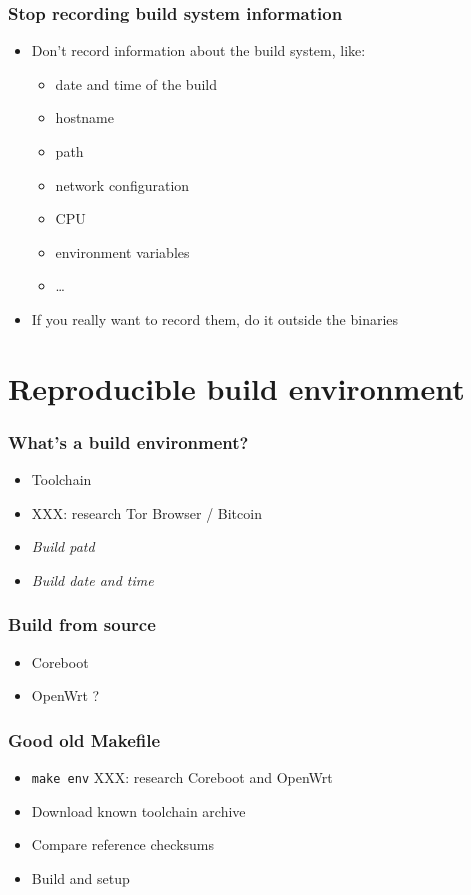 \documentclass[14pt,ignorenonframetext]{beamer}
\begin{document}
\begin{frame}
 \frametitle{Stop recording build system information}

 \begin{itemize}
  \item Don't record information about the build system, like:
   \begin{itemize}
    \item date and time of the build
    \item hostname
    \item path
    \item network configuration
    \item CPU
    \item environment variables
    \item …
   \end{itemize}
  \item<2> If you really want to record them, do it outside the binaries
 \end{itemize}
\end{frame}

\section{Reproducible build environment}

\begin{frame}
 \frametitle{What's a build environment?}

 \begin{itemize}
  \item Toolchain
  \item XXX: research Tor Browser / Bitcoin
  \item \textit{Build patd}
  \item \textit{Build date and time}
 \end{itemize}
\end{frame}

\begin{frame}
 \frametitle{Build from source}

 \begin{itemize}
  \item Coreboot
  \item OpenWrt ?
 \end{itemize}
\end{frame}

\begin{frame}
 \frametitle{Good old Makefile}

 \begin{itemize}
  \item \texttt{make env} XXX: research Coreboot and OpenWrt
  \item Download known toolchain archive
  \item Compare reference checksums
  \item Build and setup
 \end{itemize}
\end{frame}
\end{document}
